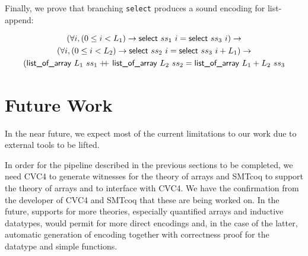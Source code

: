 \documentclass[onecolumn, preprint]{sigplanconf}
\newcommand{\select}[2]{\textsf{select } #1\ #2}
\newcommand{\loa}[2]{\textsf{list\_of\_array } #1\ #2}
\newcommand{\codeinl}[1]{\texttt{#1}}
\newcommand\doubleplus{+\kern-1.3ex+\kern0.8ex}
\begin{document}

Finally, we prove that branching \codeinl{select} produces a sound encoding for list-append:

\begin{multline*}
(\forall i, (0 \leq i < L_1) \to \select{ss_1}{i} = \select{ss_3}{i}) \to \\
  (\forall i, (0 \leq i < L_2) \to \select{ss_2}{i} = \select{ss_3}{i + L_1}) \to  \\
  (\loa{L_1}{ss_1} \doubleplus \loa{L_2}{ss_2} = \loa{L_1 + L_2}{ss_3}
\end{multline*}

\section{Future Work}
\label{sec:future}
In the near future, we expect most of the current limitations to our work due to external tools to be lifted.

In order for the pipeline described in the previous sections to be completed, we need CVC4 to generate witnesses for the theory of arrays and SMTcoq to support the theory of arrays and to interface with CVC4. We have the confirmation from the developer of CVC4 and SMTcoq that these are being worked on. In the future, supports for more theories, especially quantified arrays and inductive datatypes, would permit for more direct encodings and, in the case of the latter, automatic generation of encoding together with correctness proof for the datatype and simple functions.
\end{document}
